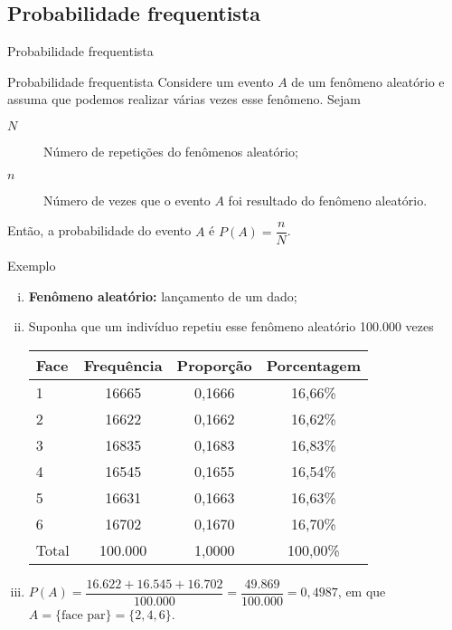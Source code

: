 \documentclass[9pt]{beamer}
\begin{document}
\subsection{Probabilidade frequentista}
\begin{frame}{Probabilidade frequentista}

{\scriptsize
	\begin{block}{Probabilidade frequentista}
		Considere um evento $A$ de um fenômeno aleatório e assuma que podemos realizar várias vezes esse fenômeno. Sejam
		\begin{description}
		 \item[$N$] Número de repetições do fenômenos aleatório;
		 \item[$n$] Número de vezes que o evento $A$ foi resultado do fenômeno aleatório.
		\end{description}
		Então, a probabilidade do evento $A$ é $P(A)=\dfrac{n}{N}$.

	\end{block}
	\begin{block}{Exemplo}
		\begin{enumerate}[i.]
			\item \textbf{Fenômeno aleatório:} lançamento de um dado;
			\item Suponha que um indivíduo repetiu esse fenômeno aleatório 100.000 vezes 
			\scriptsize{
			\begin{table}[ht]
				\centering
				\begin{tabular}{l|c|c|c}
					\toprule[0.05cm]
					Face & Frequência & Proporção & Porcentagem \\ 
					\midrule[0.05cm]
					1 & 16665 & 0,1666 & 16,66\% \\ 
					2 & 16622 & 0,1662 & 16,62\% \\ 
					3 & 16835 & 0,1683 & 16,83\% \\ 
					4 & 16545 & 0,1655 & 16,54\% \\ 
					5 & 16631 & 0,1663 & 16,63\% \\ 
					6 & 16702 & 0,1670 & 16,70\% \\ 
					\midrule[0.05cm]
					Total & 100.000 & 1,0000 & 100,00\% \\
					\bottomrule[0.05cm]
				\end{tabular}
			\end{table}
			}
		\item $P(A) = \dfrac{16.622+16.545+16.702}{100.000} = \dfrac{49.869}{100.000} = 0,4987$, em que $A=\{\mbox{face par}\}=\{2,4,6\}$.
		\end{enumerate}
		
	\end{block}
}
\end{frame}
\end{document}
